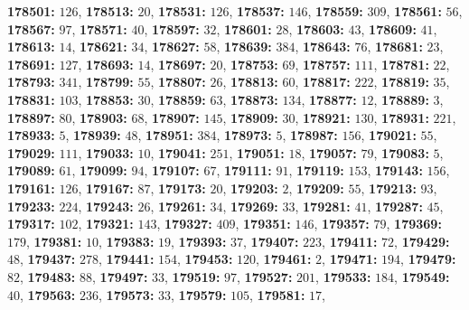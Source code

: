 \textsf{\bfseries 178501:} $126$, \textsf{\bfseries 178513:} $20$, \textsf{\bfseries 178531:} $126$, \textsf{\bfseries 178537:} $146$, \textsf{\bfseries 178559:} $309$, \textsf{\bfseries 178561:} $56$, \textsf{\bfseries 178567:} $97$, \textsf{\bfseries 178571:} $40$, \textsf{\bfseries 178597:} $32$, \textsf{\bfseries 178601:} $28$, \textsf{\bfseries 178603:} $43$, \textsf{\bfseries 178609:} $41$, \textsf{\bfseries 178613:} $14$, \textsf{\bfseries 178621:} $34$, \textsf{\bfseries 178627:} $58$, \textsf{\bfseries 178639:} $384$, \textsf{\bfseries 178643:} $76$, \textsf{\bfseries 178681:} $23$, \textsf{\bfseries 178691:} $127$, \textsf{\bfseries 178693:} $14$, \textsf{\bfseries 178697:} $20$, \textsf{\bfseries 178753:} $69$, \textsf{\bfseries 178757:} $111$, \textsf{\bfseries 178781:} $22$, \textsf{\bfseries 178793:} $341$, \textsf{\bfseries 178799:} $55$, \textsf{\bfseries 178807:} $26$, \textsf{\bfseries 178813:} $60$, \textsf{\bfseries 178817:} $222$, \textsf{\bfseries 178819:} $35$, \textsf{\bfseries 178831:} $103$, \textsf{\bfseries 178853:} $30$, \textsf{\bfseries 178859:} $63$, \textsf{\bfseries 178873:} $134$, \textsf{\bfseries 178877:} $12$, \textsf{\bfseries 178889:} $3$, \textsf{\bfseries 178897:} $80$, \textsf{\bfseries 178903:} $68$, \textsf{\bfseries 178907:} $145$, \textsf{\bfseries 178909:} $30$, \textsf{\bfseries 178921:} $130$, \textsf{\bfseries 178931:} $221$, \textsf{\bfseries 178933:} $5$, \textsf{\bfseries 178939:} $48$, \textsf{\bfseries 178951:} $384$, \textsf{\bfseries 178973:} $5$, \textsf{\bfseries 178987:} $156$, \textsf{\bfseries 179021:} $55$, \textsf{\bfseries 179029:} $111$, \textsf{\bfseries 179033:} $10$, \textsf{\bfseries 179041:} $251$, \textsf{\bfseries 179051:} $18$, \textsf{\bfseries 179057:} $79$, \textsf{\bfseries 179083:} $5$, \textsf{\bfseries 179089:} $61$, \textsf{\bfseries 179099:} $94$, \textsf{\bfseries 179107:} $67$, \textsf{\bfseries 179111:} $91$, \textsf{\bfseries 179119:} $153$, \textsf{\bfseries 179143:} $156$, \textsf{\bfseries 179161:} $126$, \textsf{\bfseries 179167:} $87$, \textsf{\bfseries 179173:} $20$, \textsf{\bfseries 179203:} $2$, \textsf{\bfseries 179209:} $55$, \textsf{\bfseries 179213:} $93$, \textsf{\bfseries 179233:} $224$, \textsf{\bfseries 179243:} $26$, \textsf{\bfseries 179261:} $34$, \textsf{\bfseries 179269:} $33$, \textsf{\bfseries 179281:} $41$, \textsf{\bfseries 179287:} $45$, \textsf{\bfseries 179317:} $102$, \textsf{\bfseries 179321:} $143$, \textsf{\bfseries 179327:} $409$, \textsf{\bfseries 179351:} $146$, \textsf{\bfseries 179357:} $79$, \textsf{\bfseries 179369:} $179$, \textsf{\bfseries 179381:} $10$, \textsf{\bfseries 179383:} $19$, \textsf{\bfseries 179393:} $37$, \textsf{\bfseries 179407:} $223$, \textsf{\bfseries 179411:} $72$, \textsf{\bfseries 179429:} $48$, \textsf{\bfseries 179437:} $278$, \textsf{\bfseries 179441:} $154$, \textsf{\bfseries 179453:} $120$, \textsf{\bfseries 179461:} $2$, \textsf{\bfseries 179471:} $194$, \textsf{\bfseries 179479:} $82$, \textsf{\bfseries 179483:} $88$, \textsf{\bfseries 179497:} $33$, \textsf{\bfseries 179519:} $97$, \textsf{\bfseries 179527:} $201$, \textsf{\bfseries 179533:} $184$, \textsf{\bfseries 179549:} $40$, \textsf{\bfseries 179563:} $236$, \textsf{\bfseries 179573:} $33$, \textsf{\bfseries 179579:} $105$, \textsf{\bfseries 179581:} $17$, 
